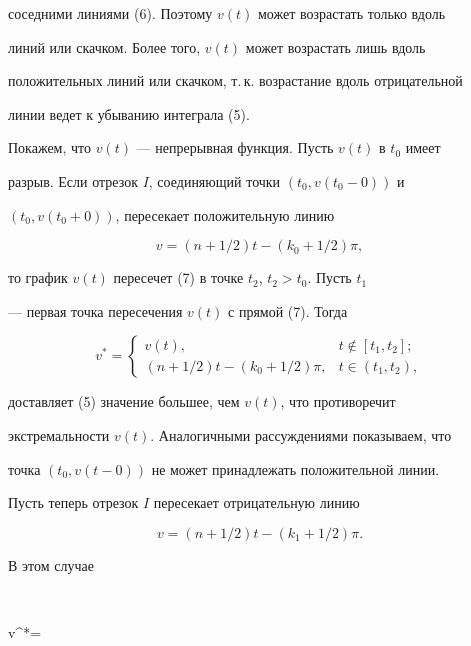 соседними линиями (6). Поэтому $v(t)$ может возрастать только вдоль 


линий или скачком. Более того, $v(t)$ может возрастать лишь вдоль 


положительных линий или скачком, т.\,к. возрастание вдоль отрицательной 


линии ведет к убыванию интеграла (5). 


 


Покажем, что $v(t)$ --- непрерывная функция. Пусть $v(t)$ в $t_0$ имеет 


разрыв. Если отрезок $I$, соединяющий точки $(t_0,v(t_0-0))$ и 


$(t_0,v(t_0+0))$, пересекает положительную линию 


\begin{equation} 


v=(n+1/2)t-(k_0+1/2)\pi, 


\end{equation} 


то график $v(t)$ пересечет (7) в точке $t_2$, $t_2>t_0$. Пусть $t_1$ 


--- первая точка пересечения $v(t)$ с прямой (7). Тогда 


$$ 


v^*= 


\begin{cases} 


v(t), & t\notin[t_1,t_2];\\ 


(n+1/2)t-(k_0+1/2)\pi, & t\in(t_1,t_2),


\end{cases} 


$$ 


доставляет (5) значение большее, чем $v(t)$, что противоречит 


экстремальности $v(t)$. Аналогичными рассуждениями показываем, что 


точка $(t_0,v(t-0))$ не может принадлежать положительной линии. 


 


Пусть теперь отрезок $I$ пересекает отрицательную линию 


$$ 


v=(n+1/2)t-(k_1+1/2)\pi. 


$$ 


В этом случае 


$$ 


v^*= 


